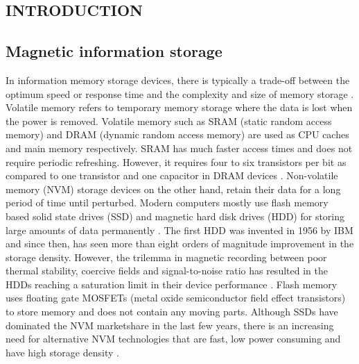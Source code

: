 \documentclass[letterpaper,10pt,doublespacing,edeposit]{uiucthesis2020}
\begin{document}


\begin{mainmatter}

\chapter{INTRODUCTION}

\section{Magnetic information storage}

In information memory storage devices, there is typically a trade-off between the optimum speed or response time and the complexity and size of memory storage \cite{Wing1986}. Volatile memory refers to temporary memory storage where the data is lost when the power is removed. Volatile memory such as SRAM (static random access memory) and DRAM (dynamic random access memory) are used as CPU caches and main memory respectively. SRAM has much faster access times and does not require periodic refreshing. However, it requires four to six transistors per bit as compared to one transistor and one capacitor in DRAM devices \cite{Meena2014}. Non-volatile memory (NVM) storage devices on the other hand, retain their data for a long period of time until perturbed. Modern computers mostly use flash memory based solid state drives (SSD) and magnetic hard disk drives (HDD) for storing large amounts of data permanently \cite{Meena2014}. The first HDD was invented in 1956 by IBM and since then, has seen more than eight orders of magnitude improvement in the storage density. However, the trilemma in magnetic recording between poor thermal stability, coercive fields and signal-to-noise ratio has resulted in the HDDs reaching a saturation limit in their device performance \cite{Krishnan2016}. Flash memory uses floating gate MOSFETs (metal oxide semiconductor field effect transistors) to store memory and does not contain any moving parts. Although SSDs have dominated the NVM marketshare in the last few years, there is an increasing need for alternative NVM technologies that are fast, low power consuming and have high storage density \cite{Meena2014}.


\end{mainmatter}
\end{document}
